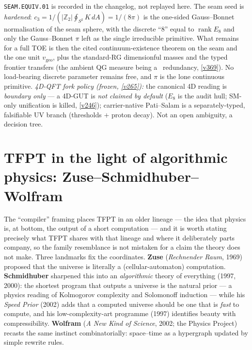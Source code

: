 \documentclass[11pt,a4paper]{article}
\newcommand{\Z}{\mathbb{Z}}
\begin{document}
\texttt{SEAM.EQUIV.01} is recorded in the changelog, not replayed here. The seam seed is \emph{hardened}:
$c_3=1/(|\Z_2|\oint_{S^2}K\,dA)=1/(8\pi)$ is the one-sided Gauss--Bonnet normalisation of the seam sphere,
with the discrete ``$8$'' equal to $\operatorname{rank}E_8$ and only the Gauss--Bonnet $\pi$ left as the
single irreducible primitive. What remains for a full TOE is then the cited continuum-existence theorem on
the seam and the one unit $v_{\mathrm{geo}}$, plus the standard-RG
dimensionful masses and the typed frontier transfers (the ambient QG measure being a \mC\ redundancy, \vref{v369}). No load-bearing discrete parameter remains free, and
$\pi$ is the lone continuous primitive. \emph{4D-QFT fork policy (frozen, \vref{v265}):} the canonical 4D
reading is \emph{boundary only} --- a 4D-GUT is \emph{not claimed by default} ($E_8$ is the audit hull;
SM-only unification is killed, \vref{v246}); carrier-native Pati--Salam is a separately-typed, falsifiable
UV branch (thresholds $+$ proton decay). Not an open ambiguity, a decision tree.

\section{TFPT in the light of algorithmic physics: Zuse--Schmidhuber--Wolfram}
\noindent The ``compiler'' framing places TFPT in an older lineage --- the idea that
physics is, at bottom, the output of a short computation --- and it is worth stating
precisely what TFPT shares with that lineage and where it deliberately parts company, so
the family resemblance is not mistaken for a claim the theory does not make. Three
landmarks fix the coordinates. \textbf{Zuse} (\emph{Rechnender Raum}, 1969) proposed that
the universe is literally a (cellular-automaton) computation. \textbf{Schmidhuber}
sharpened this into an \emph{algorithmic} theory of everything (1997, 2000): the shortest
program that outputs a universe is the natural prior --- a physics reading of Kolmogorov
complexity and Solomonoff induction --- while his \emph{Speed Prior} (2002) adds that a
computed universe should be one that is \emph{fast} to compute, and his
low-complexity-art programme (1997) identifies beauty with compressibility.
\textbf{Wolfram} (\emph{A New Kind of Science}, 2002; the Physics Project) recasts the
same instinct combinatorially: space--time as a hypergraph updated by simple rewrite
rules.
\end{document}

